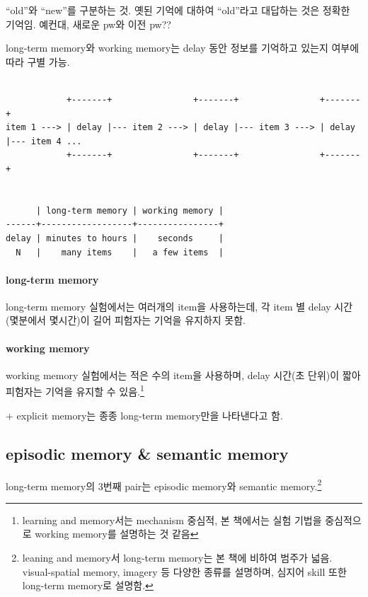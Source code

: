 \documentclass[../note.tex]{subfiles}
\begin{document}
\begin{definition}
  ``old''와 ``new''를 구분하는 것. 옛된 기억에 대하여 ``old''라고 대답하는 것은 정확한 기억임. 예컨대, 새로운 pw와 이전 pw??
\end{definition}
long-term memory와 working memory는 delay 동안 정보를 기억하고 있는지 여부에 따라 구별 가능.

\begin{center}
  \small
  \begin{spacing}{0.8}
    \begin{BVerbatim}

            +-------+                +-------+                +-------+
item 1 ---> | delay |--- item 2 ---> | delay |--- item 3 ---> | delay |--- item 4 ...
            +-------+                +-------+                +-------+


      | long-term memory | working memory |
------+------------------+----------------+
delay | minutes to hours |    seconds     |
  N   |    many items    |   a few items  |
    \end{BVerbatim}
  \end{spacing}
\end{center}

\paragraph{long-term memory}
long-term memory 실험에서는 여러개의 item을 사용하는데, 각 item 별 delay 시간(몇분에서 몇시간)이 길어 피험자는 기억을 유지하지 못함.

\paragraph{working memory}
working memory 실험에서는 적은 수의 item을 사용하며, delay 시간(초 단위)이 짧아 피험자는 기억을 유지할 수 있음.\footnote{learning and memory서는 mechanism 중심적, 본 책에서는 실험 기법을 중심적으로 working memory를 설명하는 것 같음}

+ explicit memory는 종종 long-term memory만을 나타낸다고 함.

\subsection{episodic memory \& semantic memory}
long-term memory의 3번째 pair는 episodic memory와 semantic memory.\footnote{leaning and memory서 long-term memory는 본 책에 비하여 범주가 넓음. visual-spatial memory, imagery 등 다양한 종류를 설명하며, 심지어 skill 또한 long-term memory로 설명함.}
\end{document}
